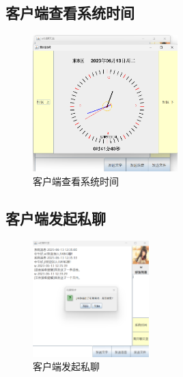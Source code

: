 \documentclass[UTF8,12pt]{article}
\begin{document}
\subsection{客户端查看系统时间}
\begin{figure}[htbp]
    \centering
    \includegraphics[width=0.5\textwidth]{img/21.png}
    \caption{客户端查看系统时间}
\end{figure}

\subsection{客户端发起私聊}
\begin{figure}[htbp]
    \centering
    \includegraphics[width=0.4\textwidth]{img/22.png}
    \caption{客户端发起私聊}
\end{figure}
\end{document}
